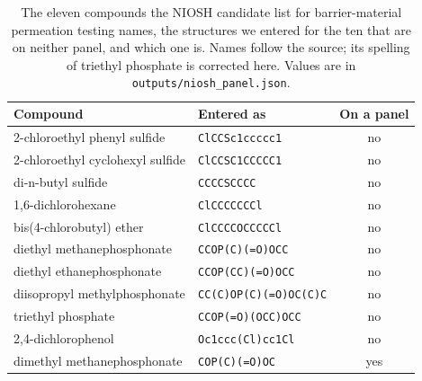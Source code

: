 \begin{table}[htb]
\centering
\caption{The eleven compounds the NIOSH candidate list for barrier-material permeation testing names, the structures we entered for the ten that are on neither panel, and which one is. Names follow the source; its spelling of triethyl phosphate is corrected here. Values are in \texttt{outputs/niosh\_panel.json}.}
\label{tab:nioshlist}
\footnotesize
\setlength{\tabcolsep}{4pt}
\begin{tabular}{llc}
\hline
Compound & Entered as & On a panel \\
\hline
2-chloroethyl phenyl sulfide & \texttt{ClCCSc1ccccc1} & no \\
2-chloroethyl cyclohexyl sulfide & \texttt{ClCCSC1CCCCC1} & no \\
di-n-butyl sulfide & \texttt{CCCCSCCCC} & no \\
1,6-dichlorohexane & \texttt{ClCCCCCCCl} & no \\
bis(4-chlorobutyl) ether & \texttt{ClCCCCOCCCCCl} & no \\
diethyl methanephosphonate & \texttt{CCOP\allowbreak (C)\allowbreak (=O)OCC} & no \\
diethyl ethanephosphonate & \texttt{CCOP\allowbreak (CC)\allowbreak (=O)OCC} & no \\
diisopropyl methylphosphonate & \texttt{CC\allowbreak (C)OP\allowbreak (C)\allowbreak (=O)OC\allowbreak (C)C} & no \\
triethyl phosphate & \texttt{CCOP\allowbreak (=O)\allowbreak (OCC)OCC} & no \\
2,4-dichlorophenol & \texttt{Oc1ccc\allowbreak (Cl)cc1Cl} & no \\
dimethyl methanephosphonate & \texttt{COP(C)\allowbreak (=O)OC} & yes \\
\hline
\end{tabular}
\end{table}

